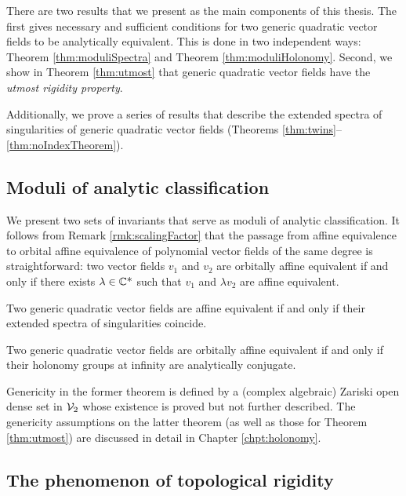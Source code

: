 \documentclass[phd,tocprelim]{cornell}
\begin{document}
There are two results that we present as the main components of this thesis. The first gives necessary and sufficient conditions for two generic quadratic vector fields to be analytically equivalent. This is done in two independent ways: Theorem \ref{thm:moduliSpectra} and Theorem \ref{thm:moduliHolonomy}. Second, we show in Theorem \ref{thm:utmost} that generic quadratic vector fields have the \textit{utmost rigidity property}.

Additionally, we prove a series of results that describe the extended spectra of singularities of generic quadratic vector fields (Theorems \ref{thm:twins}--\ref{thm:noIndexTheorem}).


\subsection{Moduli of analytic classification}

We present two sets of invariants that serve as moduli of analytic classification. It follows from Remark \ref{rmk:scalingFactor} that the passage from affine equivalence to orbital affine equivalence of polynomial vector fields of the same degree is straightforward: two vector fields $v_1$ and $v_2$ are orbitally affine equivalent if and only if there exists $\lambda\in\mathbb{C}\mbox{*}$ such that $v_1$ and $\lambda v_2$ are affine equivalent.

\begin{theorem}\label{thm:moduliSpectra}
 Two generic quadratic vector fields are affine equivalent if and only if their extended spectra of singularities coincide.
\end{theorem}

\begin{theorem}\label{thm:moduliHolonomy}
 Two generic quadratic vector fields are orbitally affine equivalent if and only if their holonomy groups at infinity are analytically conjugate.
\end{theorem}


Genericity in the former theorem is defined by a (complex algebraic) Zariski open dense set in $\mathcal{V}_2$ whose existence is proved but not further described. The genericity assumptions on the latter theorem (as well as those for Theorem \ref{thm:utmost}) are discussed in detail in Chapter \ref{chpt:holonomy}.


\subsection{The phenomenon of topological rigidity}\label{subsec:rigidity}
\end{document}
